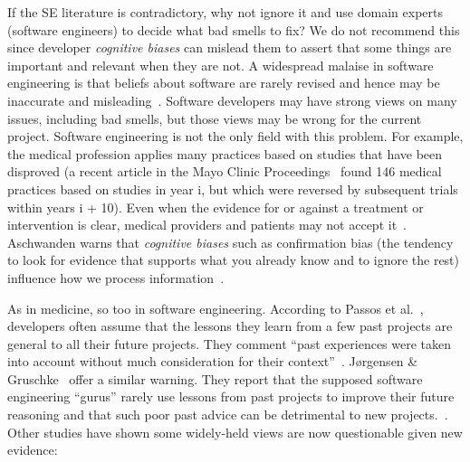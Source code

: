 \documentclass[twocolumn,5p]{elsarticle}
\theoremstyle{break}
\begin{document}
If the SE literature is contradictory, why not ignore it and use domain experts (software engineers) to decide
what bad smells to fix? We do not recommend this since developer {\em cognitive biases} can mislead them to
assert that some things are important and relevant when they are not. 
A widespread malaise in software engineering is that
beliefs about software are rarely revised and hence may be
  inaccurate and 
misleading~\cite{passos11,jorgensen09,mei15,me16phase,prem16}. Software developers may have strong views on many issues, including bad smells, but those views may be wrong for the current
project.
Software engineering is not the only field with this problem.
  For example, the medical profession applies many practices based on studies that have been disproved (a recent article in the Mayo Clinic Proceedings~\cite{prasad13} found 146 medical practices based on studies in year i, but which were reversed by subsequent trials within years i + 10). Even when the evidence for or against a treatment or intervention is clear, medical providers and patients may not accept it~\cite{aschwanden10}. Aschwanden warns that {\em cognitive biases} such as confirmation bias (the tendency to look for evidence that supports what you already know and to ignore the rest) influence how we process information~\cite{aschwanden15}.

As in medicine, so too in software engineering.
According to Passos et al.~\cite{passos11},  developers often  assume that the lessons they learn from a few past projects are general to all their future projects. They comment ``past experiences were taken into account without much consideration for their context''~\cite{passos11}.  J{\o}rgensen \& Gruschke~\cite{jorgensen09} offer a similar warning. They report that the supposed software engineering ``gurus'' rarely use lessons from past projects to improve their future reasoning and that such poor past advice can be detrimental to new projects.~\cite{jorgensen09}. Other studies have shown some widely-held views are   now questionable given new evidence:
\end{document}
